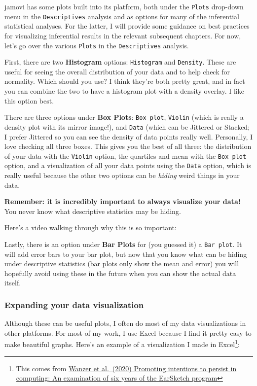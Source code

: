 \documentclass[
]{book}
\begin{document}
jamovi has some plots built into its platform, both under the \texttt{Plots} drop-down menu in the \texttt{Descriptives} analysis and as options for many of the inferential statistical analyses. For the latter, I will provide some guidance on best practices for visualizing inferential results in the relevant subsequent chapters. For now, let's go over the various \texttt{Plots} in the \texttt{Descriptives} analysis.

First, there are two \textbf{Histogram} options: \texttt{Histogram} and \texttt{Density}. These are useful for seeing the overall distribution of your data and to help check for normality. Which should you use? I think they're both pretty great, and in fact you can combine the two to have a histogram plot with a density overlay. I like this option best.

There are three options under \textbf{Box Plots}: \texttt{Box\ plot}, \texttt{Violin} (which is really a density plot with its mirror image!), and \texttt{Data} (which can be Jittered or Stacked; I prefer Jittered so you can see the density of data points really well. Personally, I love checking all three boxes. This gives you the best of all three: the distribution of your data with the \texttt{Violin} option, the quartiles and mean with the \texttt{Box\ plot} option, and a visualization of all your data points using the \texttt{Data} option, which is really useful because the other two options can be \emph{hiding} weird things in your data.

\textbf{Remember: it is incredibly important to always visualize your data!} You never know what descriptive statistics may be hiding.

Here's a video walking through why this is so important:

Lastly, there is an option under \textbf{Bar Plots} for (you guessed it) a \texttt{Bar\ plot}. It will add error bars to your bar plot, but now that you know what can be hiding under descriptive statistics (bar plots only show the mean and error) you will hopefully avoid using these in the future when you can show the actual data itself.

\hypertarget{expanding-your-data-visualization}{%
\subsubsection{Expanding your data visualization}\label{expanding-your-data-visualization}}

Although these can be useful plots, I often do most of my data visualizations in other platforms. For most of my work, I use Excel because I find it pretty easy to make beautiful graphs. Here's an example of a visualization I made in Excel\footnote{This comes from \href{https://doi.org/10.1080/08993408.2020.1714313}{Wanzer et al.~(2020) Promoting intentions to persist in computing: An examination of six years of the EarSketch program}}:
\end{document}
